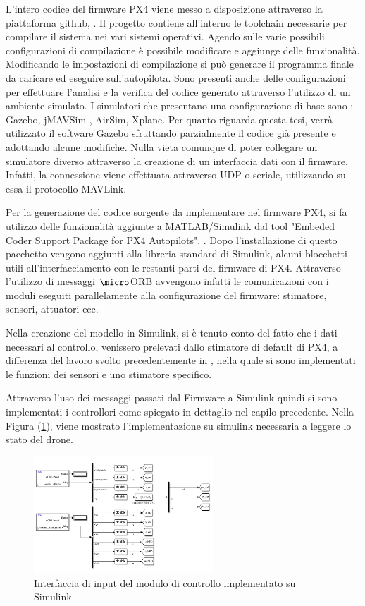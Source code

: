 L'intero codice del firmware PX4 viene messo a disposizione attraverso la piattaforma github, \cite{PX4-FIRMWAREGIT}. Il progetto contiene all'interno le toolchain necessarie per compilare il sistema nei vari sistemi operativi. Agendo sulle varie possibili configurazioni di compilazione è possibile modificare e aggiunge delle funzionalità. Modificando le impostazioni di compilazione si può generare il programma finale da caricare ed eseguire sull'autopilota.
Sono presenti anche delle configurazioni per effettuare l'analisi e la verifica del codice generato attraverso l'utilizzo di un ambiente simulato. I simulatori che presentano una configurazione di base sono : Gazebo, jMAVSim , AirSim, Xplane. Per quanto riguarda questa tesi, verrà utilizzato il software Gazebo sfruttando parzialmente il codice già presente e adottando alcune modifiche. Nulla vieta comunque di poter collegare un simulatore diverso attraverso la creazione di un interfaccia dati con il firmware. Infatti, la connessione viene effettuata attraverso UDP o seriale, utilizzando su essa il protocollo MAVLink.

Per la generazione del codice sorgente da implementare nel firmware PX4, si fa utilizzo delle funzionalità aggiunte a MATLAB/Simulink dal tool "Embeded Coder Support Package for PX4 Autopilots", \cite{PX4MATLAB}. Dopo l'installazione di questo pacchetto vengono aggiunti alla libreria standard di Simulink, alcuni blocchetti utili all'interfacciamento con le restanti parti del firmware di PX4. Attraverso l'utilizzo di messaggi $\micro$ORB avvengono infatti le comunicazioni con i moduli eseguiti parallelamente alla configurazione del firmware: stimatore, sensori, attuatori ecc.

Nella creazione del modello in Simulink, si è tenuto conto del fatto che i dati necessari al controllo, venissero prelevati dallo stimatore di default di PX4, a differenza del lavoro svolto precedentemente in \cite{DesTestCarm}, nella quale si sono implementati le funzioni dei sensori e uno stimatore specifico.

Attraverso l'uso dei messaggi passati dal Firmware a Simulink quindi si sono implementati i controllori come spiegato in dettaglio nel capilo precedente. Nella Figura (\ref{fig:in}), viene mostrato l'implementazione su simulink necessaria a leggere lo stato del drone.

\begin{figure}
	\centering
	\includegraphics[width=0.6\textwidth]{DescrizioneAutopilota/Figure/IN}
	\caption{Interfaccia di input del modulo di controllo implementato su Simulink}
	\label{fig:in}
\end{figure}

